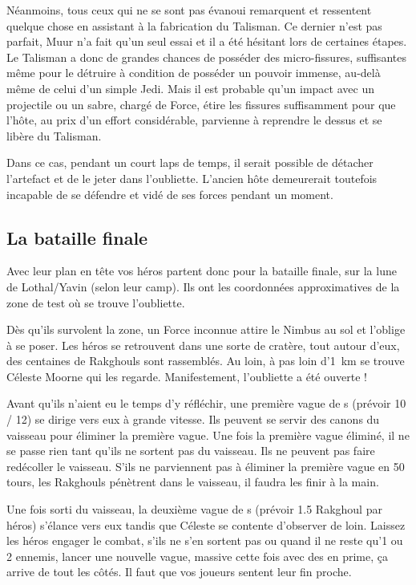 Néanmoins, tous ceux qui ne se sont pas évanoui remarquent et ressentent quelque chose en assistant à la fabrication du Talisman. Ce dernier n’est pas parfait, Muur n’a fait qu’un seul essai et il a été hésitant lors de certaines étapes. Le Talisman a donc de grandes chances de posséder des micro-fissures, suffisantes même pour le détruire à condition de posséder un pouvoir immense, au-delà même de celui d’un simple Jedi. Mais il est probable qu’un impact avec un projectile ou un sabre, chargé de Force, étire les fissures suffisamment pour que l’hôte, au prix d’un effort considérable, parvienne à reprendre le dessus et se libère du Talisman.

Dans ce cas, pendant un court laps de temps, il serait possible de détacher l’artefact et de le jeter dans l’oubliette. L’ancien hôte demeurerait toutefois incapable de se défendre et vidé de ses forces pendant un moment.

\subsection{La bataille finale}
Avec leur plan en tête vos héros partent donc pour la bataille finale, sur la lune de Lothal/Yavin (selon leur camp). Ils ont les coordonnées approximatives de la zone de test où se trouve l’oubliette. 

Dès qu’ils survolent la zone, un Force inconnue attire le Nimbus au sol et l’oblige à se poser. Les héros se retrouvent dans une sorte de cratère, tout autour d’eux, des centaines de Rakghouls sont rassemblés. Au loin, à pas loin d’1~km se trouve Céleste Moorne qui les regarde. Manifestement, l’oubliette a été ouverte !

Avant qu’ils n’aient eu le temps d’y réfléchir, une première vague de s (prévoir 10 / 12) se dirige vers eux à grande vitesse. Ils peuvent se servir des canons du vaisseau pour éliminer la première vague. Une fois la première vague éliminé, il ne se passe rien tant qu’ils ne sortent pas du vaisseau. Ils ne peuvent pas faire redécoller le vaisseau. S’ils ne parviennent pas à éliminer la première vague en 50 tours, les Rakghouls pénètrent dans le vaisseau, il faudra les finir à la main.

Une fois sorti du vaisseau, la deuxième vague de s (prévoir 1.5 Rakghoul par héros) s’élance vers eux tandis que Céleste se contente d’observer de loin. Laissez les héros engager le combat, s’ils ne s’en sortent pas ou quand il ne reste qu’1 ou 2 ennemis, lancer une nouvelle vague, massive cette fois avec des  en prime, ça arrive de tout les côtés. Il faut que vos joueurs sentent leur fin proche. 

